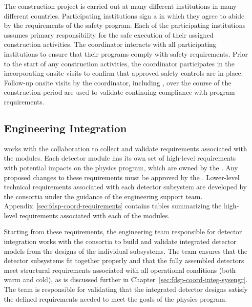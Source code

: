 The  construction project is carried out at many different
institutions in many different countries.  Participating institutions
sign a  in which they agree to abide by the requirements of
the  safety program.  Each of the participating
institutions assumes primary responsibility for the safe execution of
their assigned construction activities.  The  
coordinator interacts with all participating institutions to
ensure that their programs comply with  safety
requirements.  Prior to the start of any construction activities, the
  coordinator participates in the 
incorporating onsite visits to confirm that approved safety controls
are in place.  Follow-up onsite visits by the  
coordinator, including , over the course of the
construction period are used to validate continuing compliance with
program requirements.

\subsection{Engineering Integration}

  works with the collaboration to 
collect and validate requirements associated with the  
modules.  Each detector module has its own set of high-level 
requirements with potential impacts on the  physics 
program, which are owned by the  .  Any 
proposed changes to these requirements must be approved by the 
.  Lower-level technical requirements associated 
with each detector subsystem are developed by the consortia 
under the guidance of the  engineering support team.  
Appendix~\ref{sec:fdsp-coord-requirements} contains tables 
summarizing the high-level requirements associated with each of 
the  modules.

Starting from these requirements, the  engineering team
responsible for detector integration works with the
 consortia to build and validate integrated detector
models from the designs of the individual subsystems.  The team
ensures that the detector subsystems fit together properly and 
that the fully assembled detectors meet structural requirements 
associated with all operational conditions (both warm and cold), as 
is discussed further in Chapter~\ref{sec:fdsp-coord-integ-sysengr}.  
The team is responsible for validating that the integrated detector 
designs satisfy the defined requirements needed to meet the goals 
of the  physics program.

